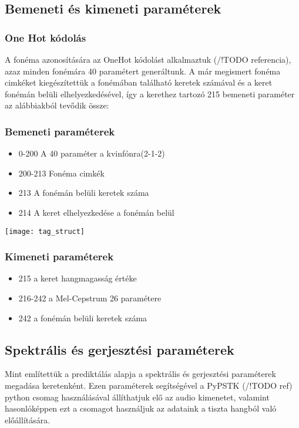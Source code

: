\subsection{Bemeneti és kimeneti paraméterek}
\subsubsection{One Hot kódolás}
A fonéma azonosítására az OneHot kódolást alkalmaztuk (/!TODO referencia), azaz minden fonémára 40 paramétert generáltunk. A már megismert fonéma cimkéket kiegészítettük a fonémában található keretek számával és a keret fonémán belüli elhelyezkedésével, így a kerethez tartozó 215 bemeneti paraméter az alábbiakból tevődik össze:
\subsubsection{Bemeneti paraméterek}
\begin{minipage}{0.5\textwidth}
\begin{itemize}
	\item 0-200 A 40 paraméter a kvinfónra(2-1-2)
	\item 200-213 Fonéma cimkék
	\item 213 A fonémán belüli keretek száma
	\item 214 A keret elhelyezkedése a fonémán belül
\end{itemize} 
\end{minipage} \hfill
\begin{minipage}{0.5\textwidth}
\texttt{[image: tag\_struct]}
\end{minipage} \hfill
\subsubsection{Kimeneti paraméterek}
\begin{itemize}
	\item 215 a keret hangmagasság értéke
	\item 216-242 a Mel-Cepstrum 26 paramétere
	\item 242 a fonémán belüli keretek száma
\end{itemize}
\subsection{Spektrális és gerjesztési paraméterek}
Mint említettük a prediktálás alapja a spektrális és gerjesztési paraméterek megadása keretenként. Ezen paraméterek segítségével a PyPSTK (/!TODO ref) python csomag használásával állíthatjuk elő az audio kimenetet, valamint hasonlóképpen ezt a csomagot használjuk az adataink a tiszta hangból való előállítására.

